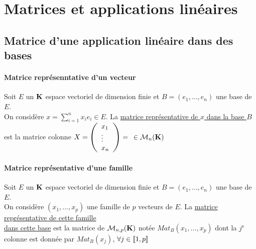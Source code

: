 

\minitoc
	\section{Matrices et applications linéaires}
	\subsection{Matrice d'une application linéaire dans des bases}
		\traitd
		\paragraph{Matrice représenntative d'un vecteur}
			Soit $E$ un ${\mathbf{K}}$ espace vectoriel de dimension finie et $B=(e_1,\dots ,e_n)$ une base de $E$.\\
			On considère $x=\sum_{i=1}^n x_ie_i \in E$. La \underline{matrice représentative de $x$ dans la base $B$} \\ est la matrice colonne 
			$X=\left( \begin{array}{l} x_1 \\ \vdots \\ x_n \end{array} \right) =~ $$ ~\in{\mathcal{M}}_n({\mathbf{K}})$ \trait \newpage \traitd
		\paragraph{Matrice représentative d'une famille}
			Soit $E$ un ${\mathbf{K}}$ espace vectoriel de dimension finie et $B=(e_1,\dots ,e_n)$ une base de $E$.\\
			On considère $(x_1, \dots ,x_p)$ une famille de $p$ vecteurs de $E$. La \underline{matrice représentative de cette famille}\\ 
			\underline{dans cette base} est la matrice de ${\mathcal{M}}_{n,p}({\mathbf{K}})$ notée $Mat_B(x_1,\dots ,x_p)$ dont la $j^{\mathrm{e}}$ colonne est donnée 
			par $Mat_B(x_j)$, $\forall j\in{\llbracket 1,p \rrbracket}$ \trait ${}$ \vspace*{-1.3cm} \traitd
